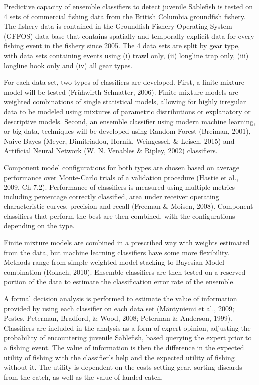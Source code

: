 \documentclass[12pt,]{scrartcl}
\begin{document}
Predictive capacity of ensemble classifiers to detect juvenile Sablefish
is tested on 4 sets of commercial fishing data from the British Columbia
groundfish fishery. The fishery data is contained in the Groundfish
Fishery Operating System (GFFOS) data base that contains spatially and
temporally explicit data for every fishing event in the fishery since
2005. The 4 data sets are split by gear type, with data sets containing
events using (i) trawl only, (ii) longline trap only, (iii) longline
hook only and (iv) all gear types.

For each data set, two types of classifiers are developed. First, a
finite mixture model will be tested (Frühwirth-Schnatter, 2006). Finite
mixture models are weighted combinations of single statistical models,
allowing for highly irregular data to be modeled using mixtures of
parametric distributions or explanatory or descriptive models. Second,
an ensemble classifier using modern machine learning, or big data,
techniques will be developed using Random Forest (Breiman, 2001), Naive
Bayes (Meyer, Dimitriadou, Hornik, Weingessel, \& Leisch, 2015) and
Artificial Neural Network (W. N. Venables \& Ripley, 2002) classifiers.

Component model configurations for both types are chosen based on
average performance over Monte-Carlo trials of a validation procedure
(Hastie et al., 2009, Ch 7.2). Performance of classifiers is measured
using multiple metrics including percentage correctly classified, area
under receiver operating characteristic curves, precision and recall
(Freeman \& Moisen, 2008). Component classifiers that perform the best
are then combined, with the configurations depending on the type.

Finite mixture models are combined in a prescribed way with weights
estimated from the data, but machine learning classifiers have some more
flexibility. Methods range from simple weighted model stacking to
Bayesian Model combination (Rokach, 2010). Ensemble classifiers are then
tested on a reserved portion of the data to estimate the classification
error rate of the ensemble.

A formal decision analysis is performed to estimate the value of
information provided by using each classifier on each data set
(Mäntyniemi et al., 2009; Pestes, Peterman, Bradford, \& Wood, 2008;
Peterman \& Anderson, 1999). Classifiers are included in the analysis as
a form of expert opinion, adjusting the probability of encountering
juvenile Sablefish, based querying the expert prior to a fishing event.
The value of information is then the difference in the expected utility
of fishing with the classifier's help and the expected utility of
fishing without it. The utility is dependent on the costs setting gear,
sorting discards from the catch, as well as the value of landed catch.
\end{document}
